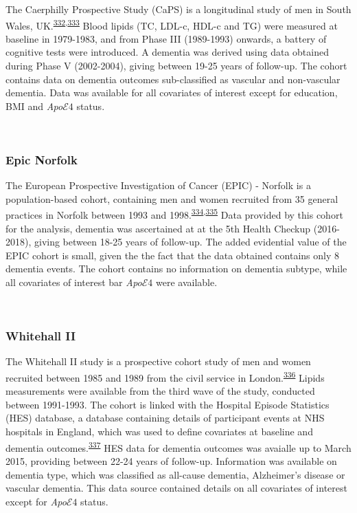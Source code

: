 \documentclass[a4paper, twoside]{templates/ociamthesis}
\begin{document}
The Caerphilly Prospective Study (CaPS) is a longitudinal study of men in South Wales, UK.\textsuperscript{\protect\hyperlink{ref-zotero-15398}{332},\protect\hyperlink{ref-elwood2013}{333}} Blood lipids (TC, LDL-c, HDL-c and TG) were measured at baseline in 1979-1983, and from Phase III (1989-1993) onwards, a battery of cognitive tests were introduced. A dementia was derived using data obtained during Phase V (2002-2004), giving between 19-25 years of follow-up. The cohort contains data on dementia outcomes sub-classified as vascular and non-vascular dementia. Data was available for all covariates of interest except for education, BMI and \emph{Apo}\(\mathcal{E}4\) status.

~

\hypertarget{epic-norfolk}{%
\subsubsection{Epic Norfolk}\label{epic-norfolk}}

The European Prospective Investigation of Cancer (EPIC) - Norfolk is a population-based cohort, containing men and women recruited from 35 general practices in Norfolk between 1993 and 1998.\textsuperscript{\protect\hyperlink{ref-riboli1997}{334},\protect\hyperlink{ref-riboli2002}{335}} Data provided by this cohort for the analysis, dementia was ascertained at at the 5th Health Checkup (2016-2018), giving between 18-25 years of follow-up. The added evidential value of the EPIC cohort is small, given the the fact that the data obtained contains only 8 dementia events. The cohort contains no information on dementia subtype, while all covariates of interest bar \emph{Apo}\(\mathcal{E}4\) were available.

~

\hypertarget{whitehall-ii}{%
\subsubsection{Whitehall II}\label{whitehall-ii}}

The Whitehall II study is a prospective cohort study of men and women recruited between 1985 and 1989 from the civil service in London.\textsuperscript{\protect\hyperlink{ref-marmot2005}{336}} Lipids measurements were available from the third wave of the study, conducted between 1991-1993. The cohort is linked with the Hospital Episode Statistics (HES) database, a database containing details of participant events at NHS hospitals in England, which was used to define covariates at baseline and dementia outcomes.\textsuperscript{\protect\hyperlink{ref-zotero-15403}{337}} HES data for dementia outcomes was avaialle up to March 2015, providing between 22-24 years of follow-up. Information was available on dementia type, which was classified as all-cause dementia, Alzheimer's disease or vascular dementia. This data source contained details on all covariates of interest except for \emph{Apo}\(\mathcal{E}4\) status.
\end{document}
